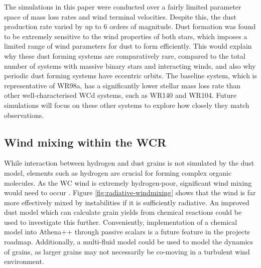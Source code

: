 \documentclass[fleqn,usenatbib]{mnras}
\begin{document}
The simulations in this paper were conducted over a fairly limited parameter space of mass loss rates and wind terminal velocities.
Despite this, the dust production rate varied by up to 6 orders of magnitude.
Dust formation was found to be extremely sensitive to the wind properties of both stars, which imposes a limited range of wind parameters for dust to form efficiently.
This would explain why these dust forming systems are comparatively rare, compared to the total number of systems with massive binary stars and interacting winds, and also why periodic dust forming systems have eccentric orbits.
The baseline system, which is representative of WR98a, has a significantly lower stellar mass loss rate than other well-characterised WCd systems, such as WR140 and WR104.
Future simulations will focus on these other systems
to explore how closely they match observations.

\subsection{Wind mixing within the WCR}

While interaction between hydrogen and dust grains is not simulated by the dust model, elements such as hydrogen are crucial for forming complex organic molecules.
As the WC wind is extremely hydrogen-poor, significant wind mixing would need to occur
\citep{herbstComplexOrganicInterstellar2009}.
Figure \ref{fig:radiative-windmixing} shows that the wind is far more effectively mixed by instabilities if it is sufficiently radiative.
An improved dust model which can calculate grain yields from chemical reactions could be used to investigate this further.
Conveniently, implementation of a chemical model into Athena++ through passive scalars is a future feature in the projects roadmap.
Additionally, a multi-fluid model could be used to model the dynamics of grains, as larger grains may not necessarily be co-moving in a turbulent wind environment.
\end{document}
